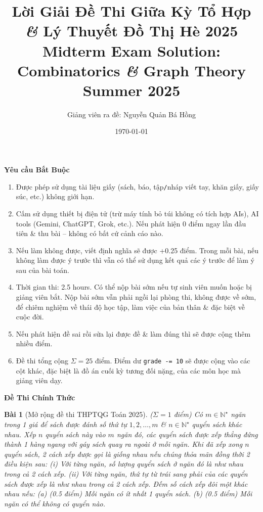 \documentclass{article}
\title{Lời Giải Đề Thi Giữa Kỳ Tổ Hợp {\it\&} Lý Thuyết Đồ Thị Hè 2025\\Midterm Exam Solution: Combinatorics {\it\&} Graph Theory Summer 2025}
\author{Giảng viên ra đề: Nguyễn Quản Bá Hồng}
\date{\today}
\newtheorem{baitoan}{Bài}
\begin{document}
\maketitle

\begin{abstract}
    
\end{abstract}
\begin{center}\large
    \textbf{\textsf{Yêu cầu Bắt Buộc}}
\end{center}

\begin{enumerate}
    \item Được phép sử dụng tài liệu giấy (sách, báo, tập{\tt/}nháp viết tay, khăn giấy, giấy súc, etc.) không giới hạn.
    \item Cấm sử dụng thiết bị điện tử (trừ máy tính bỏ túi không có tích hợp AIs), AI tools (Gemini, ChatGPT, Grok, etc.). Nếu phát hiện 0 điểm ngay lần đầu tiên \& thu bài -- không có bất cứ cảnh cáo nào.
    \item Nếu làm không được, viết định nghĩa sẽ được +0.25 điểm. Trong mỗi bài, nếu không làm được ý trước thì vẫn có thể sử dụng kết quả các ý trước để làm ý sau của bài toán.
    \item Thời gian thi: 2.5 hours. Có thể nộp bài sớm nếu tự sinh viên muốn hoặc bị giảng viên bắt. Nộp bài sớm vẫn phải ngồi lại phòng thi, không được về sớm, để chiêm nghiệm về thái độ học tập, làm việc của bản thân \& đặc biệt về cuộc đời.
    \item Nếu phát hiện đề sai rồi sửa lại được đề \& làm đúng thì sẽ được cộng thêm nhiều điểm.
    \item Đề thi tổng cộng $\Sigma = 25$ điểm. Điểm dư {\tt grade -= 10} sẽ được cộng vào các cột khác, đặc biệt là đồ án cuối kỳ tương đối nặng, của các môn học mà giảng viên dạy.
\end{enumerate}

\begin{center}\large
    \textbf{\textsf{Đề Thi Chính Thức}}
\end{center}

\begin{baitoan}[Mở rộng đề thi THPTQG Toán 2025]
    {\rm($\Sigma = 1$ điểm)} Có $m\in\mathbb{N}^\star$ ngăn trong 1 giá để sách được đánh số thứ tự $1,2,\ldots,m$ \& $n\in\mathbb{N}^\star$ quyển sách khác nhau. Xếp $n$ quyển sách này vào $m$ ngăn đó, các quyển sách được xếp thẳng đứng thành 1 hàng ngang với gáy sách quay ra ngoài ở mỗi ngăn. Khi đã xếp xong $n$ quyển sách, 2 cách xếp được gọi là {\rm giống nhau} nếu chúng thỏa mãn đồng thời 2 điều kiện sau: (i) Với từng ngăn, số lượng quyển sách ở ngăn đó là như nhau trong cả 2 cách xếp. (ii) Với từng ngăn, thứ tự từ trái sang phải của các quyển sách được xếp là như nhau trong cả 2 cách xếp. Đếm số cách xếp đôi một khác nhau nếu: (a) {\rm(0.5 điểm)} Mỗi ngăn có ít nhất 1 quyển sách. (b) {\rm(0.5 điểm)} Mỗi ngăn có thể không có quyển nào.
\end{baitoan}
\end{document}
